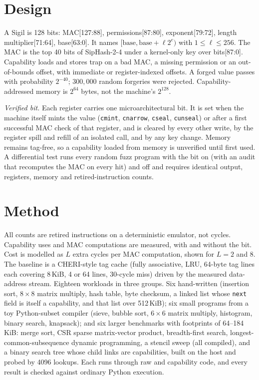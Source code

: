 \documentclass[10pt,twocolumn,a4paper]{article}
\begin{document}
\section{Design}
A Sigil is 128 bits: MAC[127:88], permissions[87:80], exponent[79:72], length multiplier[71:64], base[63:0]. It names $[\text{base},\text{base}+\ell 2^{e})$ with $1\le\ell\le256$. The MAC is the top 40 bits of SipHash-2-4 \cite{siphash} under a kernel-only key over bits[87:0]. Capability loads and stores trap on a bad MAC, a missing permission or an out-of-bounds offset, with immediate or register-indexed offsets. A forged value passes with probability $2^{-40}$; $300{,}000$ random forgeries were rejected. Capability-addressed memory is $2^{64}$ bytes, not the machine's $2^{128}$.

\emph{Verified bit.} Each register carries one microarchitectural bit. It is set when the machine itself mints the value (\texttt{cmint}, \texttt{cnarrow}, \texttt{cseal}, \texttt{cunseal}) or after a first successful MAC check of that register, and is cleared by every other write, by the register spill and refill of an isolated call, and by any key change. Memory remains tag-free, so a capability loaded from memory is unverified until first used. A differential test runs every random fuzz program with the bit on (with an audit that recomputes the MAC on every hit) and off and requires identical output, registers, memory and retired-instruction counts.

\section{Method}
All counts are retired instructions on a deterministic emulator, not cycles. Capability uses and MAC computations are measured, with and without the bit. Cost is modelled as $L$ extra cycles per MAC computation, shown for $L{=}2$ and $8$. The baseline is a CHERI-style tag cache (fully associative, LRU, 64-byte tag lines each covering 8\,KiB, 4 or 64 lines, 30-cycle miss) driven by the measured data-address stream. Eighteen workloads in three groups. Six hand-written (insertion sort, $8{\times}8$ matrix multiply, hash table, byte checksum, a linked list whose \texttt{next} field is itself a capability, and that list over 512\,KiB); six small programs from a toy Python-subset compiler (sieve, bubble sort, $6{\times}6$ matrix multiply, histogram, binary search, knapsack); and six larger benchmarks with footprints of 64--184\,KiB: merge sort, CSR sparse matrix-vector product, breadth-first search, longest-common-subsequence dynamic programming, a stencil sweep (all compiled), and a binary search tree whose child links are capabilities, built on the host and probed by 4096 lookups. Each runs through raw and capability code, and every result is checked against ordinary Python execution.
\end{document}
